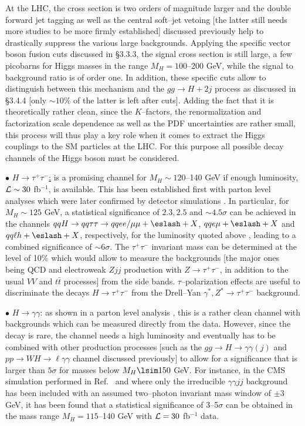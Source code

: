 At the LHC, the cross section is two orders of magnitude larger and the double
forward jet tagging as well as the central soft--jet vetoing [the latter still
needs more studies to be more firmly established] discussed previously help to
drastically suppress the various large backgrounds.  Applying the specific
vector boson fusion cuts discussed in \S3.3.3, the signal cross section is
still large, a few picobarns for Higgs masses in the range $M_H=100$--200 GeV,
while the signal to background ratio is of order one. In addition, these
specific cuts allow to distinguish between this mechanism and the $gg \to H+2j$
process as discussed in \S3.4.4 [only $\sim 10\%$ of the latter is left after
cuts].  Adding the fact that it is theoretically rather clean, since the
$K$--factors, the renormalization and factorization scale dependence as well as
the PDF uncertainties are rather small, this process will thus play a key role
when it comes to extract the Higgs couplings to the SM particles at the LHC. 
For this purpose all possible decay channels of the Higgs boson must be
considered. \s

$\bullet$ \underline{$H \to \tau^+ \tau^-$:} is a promising channel for
$M_H\sim 120$--140 GeV if enough luminosity, ${\cal L}\sim 30$ fb$^{-1}$, is
available. This has been established first with parton level analyses
\cite{Zepp-tau} which were later confirmed by detector simulations
\cite{ATLAS-review,AzuelosHC01,Exp:Hqq-tau}. In particular, for $M_H \sim 125$
GeV, a statistical  significance of $2.3, 2.5$ and $\sim 4.5\sigma$ can be
achieved in the channels $qqH \to qq \tau \tau \to qq ee/\mu \mu + \eslash +X$,
$qq e\mu + \eslash +X$ and $qq \ell h + \eslash +X$, respectively, for the
luminosity quoted above \cite{AzuelosHC01}, leading to a combined significance
of $\sim 6\sigma$. The $\tau^+ \tau^-$ invariant mass can be determined at the
level of 10\% which would allow to measure the backgrounds [the major ones
being QCD and electroweak $Zjj$ production with $Z\to \tau^+ \tau^-$, in
addition to the usual $VV$ and $t\bar t$ processes] from the side bands. 
$\tau$--polarization effects \cite{tauola} are useful to discriminate the
decays $H \to \tau^+ \tau^-$ from the Drell--Yan $\gamma^*, Z^* \to \tau^+
\tau^-$ background.\s

$\bullet$ \underline{$H \to \gamma \gamma$}: as shown in a parton level
analysis \cite{Zepp-gamma}, this is a rather clean channel with backgrounds
which can be measured directly from the data. However, since the decay is rare,
the channel needs a  high luminosity and eventually has to be combined with
other production processes [such as the $gg \to H \to \gamma \gamma (j)$ and
$pp \to WH \to \ell\gamma \gamma$ channel discussed previously] to allow for  a
significance that is larger than $5\sigma$ for masses below $M_H\lsim 150$ GeV.
For instance, in the CMS simulation performed in Ref.~\cite{pp-Hqq-Dubinin} and
where only the irreducible $\gamma \gamma jj$ background has been included with
an assumed two--photon invariant mass window of $\pm 3$ GeV, it has been found
that a statistical significance of 3--5$\sigma$ can be obtained in the mass
range $M_H=115$--140 GeV with ${\cal L}=30$ fb$^{-1}$ data. \s

